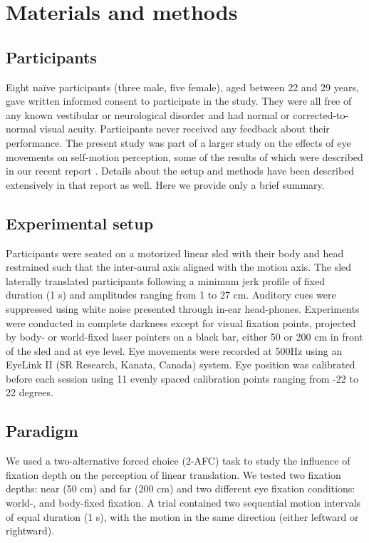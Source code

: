 \section{Materials and methods}
\label{p4:sec:methods}

\subsection{Participants}

Eight na\"ive participants (three male, five female), aged between 22 and 29 years, gave written informed consent to participate in the study. They were all free of any known vestibular or neurological disorder and had normal or corrected-to-normal visual acuity. Participants never received any feedback about their performance. The present study was part of a larger study on the effects of eye movements on self-motion perception, some of the results of which were described in our recent report \cite{clemens2015a}. Details about the setup and methods have been described extensively in that report as well. Here we provide only a brief summary.


\subsection{Experimental setup}

Participants were seated on a motorized linear sled with their body and head restrained such that the inter-aural axis aligned with the motion axis. The sled laterally translated participants following a minimum jerk profile of fixed duration (1 \si{\second}) and amplitudes ranging from 1 to 27 \si{\centi\metre}. Auditory cues were suppressed using white noise presented through in-ear head-phones. Experiments were conducted in complete darkness except for visual fixation points, projected by body- or world-fixed laser pointers on a black bar, either 50 or 200 \si{\centi\metre} in front of the sled and at eye level. Eye movements were recorded at 500Hz using an EyeLink II (SR Research, Kanata, Canada) system. Eye position was calibrated before each session using 11 evenly spaced calibration points ranging from -22 to 22 degrees.


\subsection{Paradigm}

We used a two-alternative forced choice (2-AFC) task to study the influence of fixation depth on the perception of linear translation. We tested two fixation depths: near (50 \si{\centi\metre}) and far (200 \si{\centi\metre}) and two different eye fixation conditions: world-, and body-fixed fixation. A trial contained two sequential motion intervals of equal duration (1 \si{\second}), with the motion in the same direction (either leftward or rightward). 


